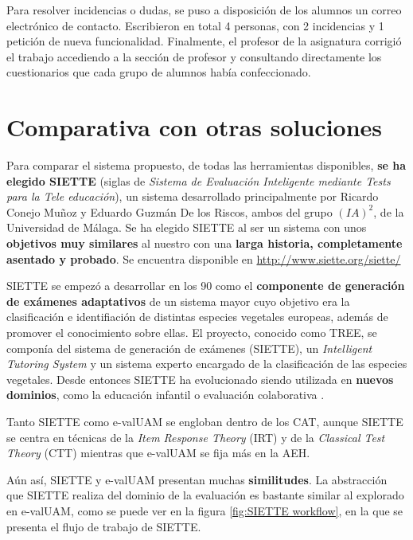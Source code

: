 Para resolver incidencias o dudas, se puso a disposición de los alumnos un correo electrónico de contacto. Escribieron en total 4 personas, con 2 incidencias y 1 petición de nueva funcionalidad. Finalmente, el profesor de la asignatura corrigió el trabajo accediendo a la sección de profesor y consultando directamente los cuestionarios que cada grupo de alumnos había confeccionado.

\section{Comparativa con otras soluciones}

Para comparar el sistema propuesto, de todas las herramientas disponibles, \textbf{se ha elegido SIETTE} (siglas de \textit{Sistema de Evaluación Inteligente mediante Tests para la Tele educación}), un sistema desarrollado principalmente por Ricardo Conejo Muñoz y Eduardo Guzmán De los Riscos, ambos del grupo $(IA)^2$, de la Universidad de Málaga. Se ha elegido SIETTE al ser un sistema con unos \textbf{objetivos muy similares} al nuestro con una \textbf{larga historia, completamente asentado y probado}. Se encuentra disponible en  \url{http://www.siette.org/siette/}

SIETTE se empezó a desarrollar en los 90 como el \textbf{componente de generación de exámenes adaptativos} de un sistema mayor cuyo objetivo era la clasificación e identifiación de distintas especies vegetales europeas, además de promover el conocimiento sobre ellas. El proyecto, conocido como TREE, se componía del sistema de generación de exámenes (SIETTE), un \textit{Intelligent Tutoring System} y un sistema experto encargado de la clasificación de las especies vegetales\cite{Rios98}. Desde entonces SIETTE ha evolucionado siendo utilizada en \textbf{nuevos dominios}, como la educación infantil\cite{Trella08} o evaluación colaborativa \cite{Conejo09}.

Tanto SIETTE como e-valUAM se engloban dentro de los \acrshort{CAT}, aunque SIETTE se centra en técnicas de la \textit{Item Response Theory} (\acrshort{IRT}) y de la \textit{Classical Test Theory} (\acrshort{CTT}) mientras que e-valUAM se fija más en la \acrshort{AEH}.

Aún así, SIETTE y e-valUAM presentan muchas \textbf{similitudes}. La abstracción que SIETTE realiza del dominio de la evaluación es bastante similar al explorado en e-valUAM, como se puede ver en la figura \ref{fig:SIETTE workflow}, en la que se presenta el flujo de trabajo de SIETTE. 

